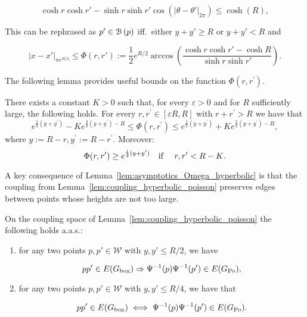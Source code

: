 $$
	\cosh r \cosh r' - \sinh r \sinh r'\cos\left( |\theta-\theta'|_{2\pi} \right) \le \cosh(R),
$$

\noindent
This can be rephrased as $p'\in {\mathcal B}\left(p\right)$ iff.~either $y+y'\geq R$ or $y+y'<R$ and 


\begin{equation}\label{eq:def_Omega_hyperbolic}
	|x-x'|_{\pi e^{R/2}} \leq \Phi(r,r') := \frac{1}{2}e^{R/2} \arccos\left( \frac{\cosh r \cosh r' - \cosh R}
	{\sinh r \sinh r'} \right).
\end{equation}

The following lemma provides useful bounds on the function $\Phi(r,r^\prime)$.

\begin{lemma}\label{lem:asymptotics_Omega_hyperbolic}
There exists a constant $K>0$ such that, for every $\varepsilon > 0$ and for $R$ sufficiently large, the following holds.
For every $r,r^\prime \in [\varepsilon R,R]$ with $r + r^\prime > R$ we have that 
\begin{equation}\label{eq:asymp1}
	e^{\frac{1}{2}(y+y^\prime)} - K e^{\frac{3}{2}(y+y^\prime) - R} \leq \Phi(r, r^\prime) 
	\leq  e^{\frac{1}{2}(y+y^\prime)} + K e^{\frac{3}{2}(y+y^\prime) - R},
\end{equation}
where $y := R - r, y^\prime := R - r^\prime$. 
Moreover:
\begin{equation}\label{eq:asymp2} 
\Phi(r,r^\prime) \geq e^{\frac12(y+y^\prime)} \quad \text{if \quad $r, r^\prime < R - K$.} 
\end{equation}
\end{lemma}

A key consequence of Lemma~\ref{lem:asymptotics_Omega_hyperbolic} is that the coupling from Lemma~\ref{lem:coupling_hyperbolic_poisson} 
preserves edges between points whose heights are not too large.  

\begin{lemma}\label{lem:coupling_edges}
On the coupling space of Lemma~\ref{lem:coupling_hyperbolic_poisson} the following holds a.a.s.:
\begin{enumerate}
\item for any two points $p, p' \in \mathcal{W}$ with $y, y'\le R/2$, we have 

$$pp' \in E(G_{\text{box}}) \Rightarrow \Psi^{-1}(p)\Psi^{-1}(p') \in E(G_{\text{Po}}), $$ 

\item for any two points $p, p' \in \mathcal{W}$ with $y, y' \le R/4$, we have that 

$$pp' \in E(G_{\text{box}}) \iff \Psi^{-1}(p)\Psi^{-1}(p') \in E(G_{\text{Po}}).$$

\end{enumerate}
\end{lemma}


